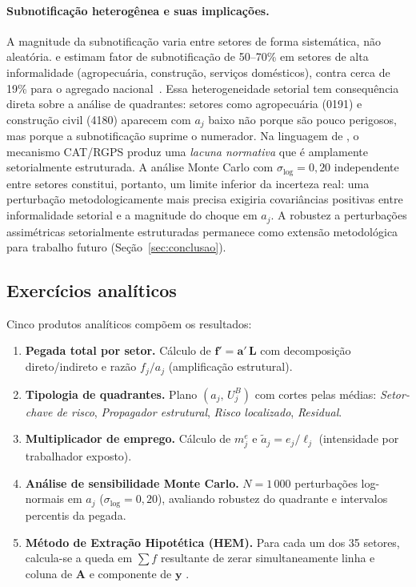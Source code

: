 \documentclass[12pt, a4paper]{article}
\begin{document}
\paragraph{Subnotificação heterogênea e suas implicações.}
A magnitude da subnotificação varia entre setores de forma sistemática,
não aleatória. \citet{chagas2011saude} e \citet{wunsch2004perfil}
estimam fator de subnotificação de 50--70\% em setores de alta
informalidade (agropecuária, construção, serviços domésticos), contra
cerca de 19\% para o agregado nacional~\citep{inss2022subnotificacao}.
Essa heterogeneidade setorial tem consequência direta sobre a análise
de quadrantes: setores como agropecuária (0191) e construção civil
(4180) aparecem com $a_j$ baixo não porque são pouco perigosos, mas
porque a subnotificação suprime o numerador. Na linguagem de
\citet{hitzig2020normative}, o mecanismo CAT/RGPS produz uma
\textit{lacuna normativa} que é amplamente setorialmente estruturada.
A análise Monte Carlo com $\sigma_{\log}=0{,}20$ independente entre
setores constitui, portanto, um limite inferior da incerteza real: uma
perturbação metodologicamente mais precisa exigiria covariâncias
positivas entre informalidade setorial e a magnitude do choque em
$a_j$. A robustez a perturbações assimétricas setorialmente estruturadas
permanece como extensão metodológica para trabalho futuro
(Seção~\ref{sec:conclusao}).

\subsection{Exercícios analíticos}

Cinco produtos analíticos compõem os resultados:
%
\begin{enumerate}
  \item \textbf{Pegada total por setor.} Cálculo de
    $\mathbf{f}' = \mathbf{a}'\, \mathbf{L}$ com decomposição
    direto/indireto e razão $f_j/a_j$ (amplificação estrutural).
  \item \textbf{Tipologia de quadrantes.} Plano $(a_j,\, U_j^B)$ com
    cortes pelas médias: \textit{Setor-chave de risco},
    \textit{Propagador estrutural}, \textit{Risco localizado},
    \textit{Residual}.
  \item \textbf{Multiplicador de emprego.} Cálculo de $m^e_j$ e
    $\tilde{a}_j = e_j/\ell_j$ (intensidade por trabalhador exposto).
  \item \textbf{Análise de sensibilidade Monte Carlo.}
    $N=1\,000$ perturbações log-normais em $a_j$
    ($\sigma_{\log}=0{,}20$), avaliando robustez do quadrante e
    intervalos percentis da pegada.
  \item \textbf{Método de Extração Hipotética (HEM).} Para cada um
    dos 35 setores, calcula-se a queda em $\sum f$ resultante de
    zerar simultaneamente linha e coluna de $\mathbf{A}$ e
    componente de $\mathbf{y}$ \citep{dietzenbacher2013expanding}.
\end{enumerate}
\end{document}
